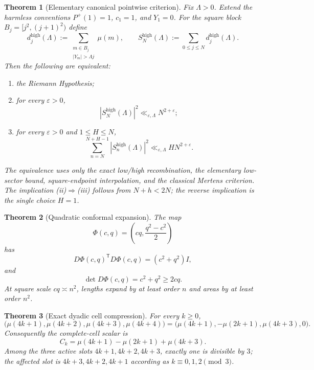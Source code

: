 \documentclass[11pt]{article}
\newtheorem{theorem}{Theorem}[section]
\theoremstyle{definition}
\theoremstyle{remark}
\newcommand{\eps}{\varepsilon}
\newcommand{\Pplus}{P^{+}}
\newcommand{\1}{\mathbf{1}}
\begin{document}
\begin{theorem}[Elementary canonical pointwise criterion]
\label{thm:intro-canonical-HS}
Fix $\Lambda>0$.  Extend the harmless conventions $\Pplus(1)=1$, $c_1=1$, and $Y_1=0$.  For the square block $B_j=[j^2,(j+1)^2)$ define
\[
 d_j^{\mathrm{high}}(\Lambda)
 :=
 \sum_{\substack{m\in B_j\\|Y_m|>\Lambda j}}\mu(m),
 \qquad
 S_N^{\mathrm{high}}(\Lambda)
 :=\sum_{0\le j\le N}d_j^{\mathrm{high}}(\Lambda).
\]
Then the following are equivalent:
\begin{enumerate}[label=\textup{(\roman*)},leftmargin=2.2em,itemsep=0.25em]
\item the Riemann Hypothesis;
\item for every $\eps>0$,
\begin{equation}
 \boxed{
 |S_N^{\mathrm{high}}(\Lambda)|^2
 \ll_{\eps,\Lambda}N^{2+\eps};
 }
 \tag{PHS}
 \label{eq:intro-canonical-PHS}
\end{equation}
\item for every $\eps>0$ and $1\le H\le N$,
\begin{equation}
 \sum_{n=N}^{N+H-1}|S_n^{\mathrm{high}}(\Lambda)|^2
 \ll_{\eps,\Lambda}HN^{2+\eps}.
 \tag{HS}
 \label{eq:intro-canonical-HS}
\end{equation}
\end{enumerate}
The equivalence uses only the exact low/high recombination, the elementary low-sector bound, square-endpoint interpolation, and the classical Mertens criterion.  The implication \textup{(ii)}$\Rightarrow$\textup{(iii)} follows from $N+h<2N$; the reverse implication is the single choice $H=1$.
\end{theorem}

\begin{theorem}[Quadratic conformal expansion]
\label{thm:intro-jacobian}
The map
\[
 \Phi(c,q)=\left(cq,\frac{q^2-c^2}{2}\right)
\]
has
\[
 D\Phi(c,q)^{\mathsf T}D\Phi(c,q)
 =(c^2+q^2)I,
\]
and
\[
 \det D\Phi(c,q)=c^2+q^2\ge2cq.
\]
At square scale $cq\asymp n^2$, lengths expand by at least order $n$ and areas by at least order $n^2$.
\end{theorem}

\begin{theorem}[Exact dyadic cell compression]
\label{thm:intro-dyadic-cell}
For every $k\ge0$,
\[
 \boxed{
 \bigl(\mu(4k+1),\mu(4k+2),\mu(4k+3),\mu(4k+4)\bigr)
 =\bigl(\mu(4k+1),-\mu(2k+1),\mu(4k+3),0\bigr).
 }
\]
Consequently the complete-cell scalar is
\[
 \boxed{C_k=\mu(4k+1)-\mu(2k+1)+\mu(4k+3).}
\]
Among the three active slots $4k+1,4k+2,4k+3$, exactly one is divisible by $3$; the affected slot is $4k+3,4k+2,4k+1$ according as $k\equiv0,1,2\pmod3$.
\end{theorem}
\end{document}
